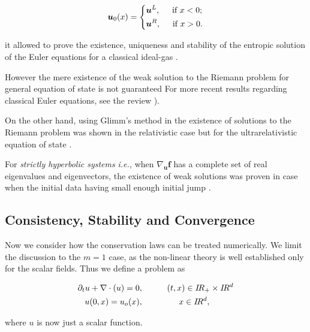 \begin{equation}
\boldsymbol{u}_0(x) = 
\begin{dcases}
\boldsymbol{u}^L, \hspace{5mm} \text{if } x<0; \\
\boldsymbol{u}^R, \hspace{5mm} \text{if } x>0.
\end{dcases}
\end{equation}

it allowed to prove the existence, uniqueness and stability of the entropic solution of the Euler equations for a classical ideal-gas \citep{Chen:2003}. 

However the mere existence of the weak solution to the Riemann problem for general equation of state is not guaranteed \citep{Curtis:1972}
For more recent results regarding classical Euler equations, see the review \citep{Chen:2006}). 

On the other hand, using Glimm’s method \citep{Glimm:1965} in the existence of solutions to the Riemann problem was shown in the relativistic case but for the ultrarelativistic equation of state \citep{Smoller:1993}. 

For \textit{strictly hyperbolic systems} \textit{i.e.,} when $\nabla_{\boldsymbol{u}}\boldsymbol{f}$ has a complete set of real eigenvalues and eigenvectors, the existence of weak solutions was proven in case when the initial data having small enough initial jump \citep{Lax:1957}.



\subsection{Consistency, Stability and Convergence}

Now we consider how the conservation laws can be treated numerically. We limit the discussion to the $m=1$ case, as the non-linear theory is well established only for the scalar fields. Thus we define a problem as 

\begin{align}
\partial_t u + \nabla\cdot\boldmath(u) = 0&, \hspace{10mm} (t,x) \in I\!R_{+}\times I\! R^d \\ 
u(0, x) = u_o(x)&, \hspace{15mm} x\in I\!R^{d},
\end{align}

where $u$ is now just a scalar function. 

